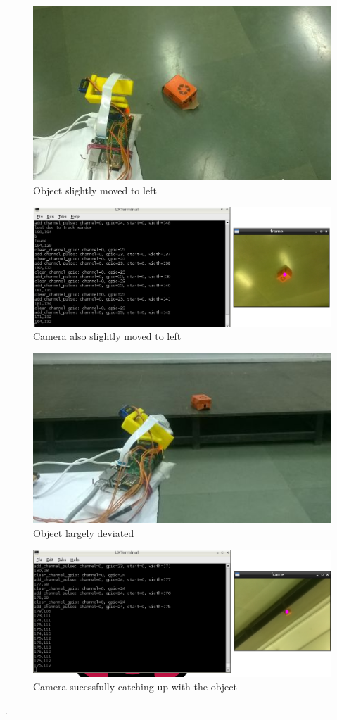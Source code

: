 \documentclass[11pt,a4paper]{article}
\begin{document}
  \begin{figure}[h]
 \includegraphics[scale=0.6]{s2.jpg}
   \centering
 \caption{Object slightly moved to left}
  \end{figure}
   \begin{figure}[h]
    \includegraphics[scale=0.5]{2.png}
   \centering
 \caption{Camera also slightly moved to left}
  \end{figure}
   \begin{figure}[h]
 \includegraphics[scale=0.6]{s3.jpg}
   \centering
 \caption{Object largely deviated}
  \end{figure}
   \begin{figure}[h]
    \includegraphics[scale=0.6]{3.png}
   \centering
 \caption{Camera sucessfully catching up with the object}
  \end{figure}
  \newpage
  .
  \newpage
\end{document}
